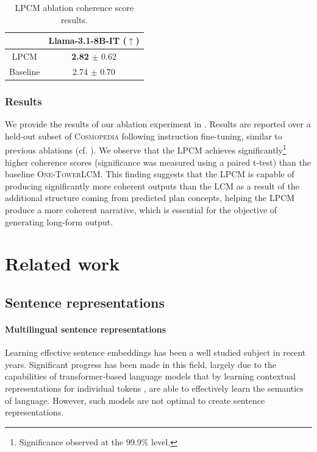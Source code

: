 \documentclass[twoside,11pt]{fairmeta}
\newcommand{\lcm}{\textsc{LCM}\xspace}
\newcommand{\interleaved}{\textsc{One-Tower}\xspace}
\newcommand{\planlcm}{\textsc{LPCM}\xspace}
\newcommand{\cosmopedia}{\textsc{Cosmopedia}\xspace}
\begin{document}
\begin{table}[ht!]
    \centering
    \begin{tabular}{cc}
    \toprule
         & Llama-3.1-8B-IT ($\uparrow$) \\
         \midrule
         \planlcm & {\bf 2.82} $\pm$ 0.62 \\
         Baseline & 2.74 $\pm$ 0.70\\
    \toprule
    \end{tabular}
    \caption{\planlcm ablation coherence score results.}
    \label{tab:hlcm_ablation_results}
\end{table}

\subsubsection*{Results} 

We provide the results of our ablation experiment in . Results are reported over a held-out subset of \cosmopedia\citep{cosmopedia} following instruction fine-tuning, similar to previous ablations (cf. ).
We observe that the \planlcm achieves significantly\footnote{Significance observed at the 99.9\% level.} higher coherence scores (significance was measured using a paired t-test) than the baseline \interleaved \lcm. This finding suggests that the \planlcm is capable of producing significantly more coherent outputs than the \lcm as a result of the additional structure coming from predicted plan concepts, helping the \planlcm produce a more coherent narrative, which is essential for the objective of generating long-form output. 
\section{Related work}


\subsection{Sentence representations}


\paragraph{Multilingual sentence representations} 


Learning effective sentence embeddings has been a well studied subject in recent years.
Significant progress has been made in this field, largely due to the capabilities of transformer-based language models that by learning contextual representations for individual tokens \citep{devlin2018bert, xlmr}, are able to effectively learn the semantics of language.
However, such models are not optimal to create sentence representations.
\end{document}
